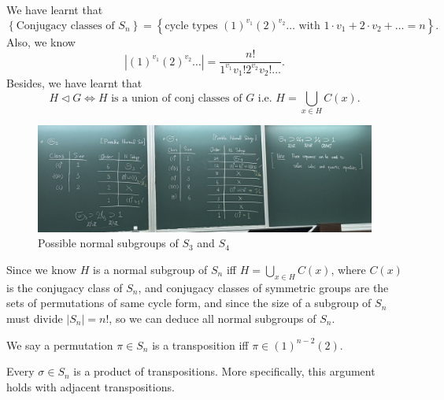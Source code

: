 \begin{prev}
    We have learnt that 
    \[
        \left\{ \text{Conjugacy classes of } S_n  \right\} = \left\{ \text{cycle types } (1)^{v_1}(2)^{v_2}\dots \text{ with } 1 \cdot v_1 + 2 \cdot v_2 + \dots = n   \right\}.  
    \]
    Also, we know 
    \[
        \left\vert (1)^{v_1} (2)^{v_2} \dots  \right\vert = \frac{n!}{1^{v_1} v_1 ! 2^{v_2} v_2 ! \dots }. 
    \]
    Besides, we have learnt that 
    \[
        H \triangleleft G \iff H \text{ is a union of conj classes of } G \text{ i.e. } H = \bigcup_{x \in H} C(x).   
    \]
\end{prev}

\begin{figure}[H]
    \centering
    \includegraphics[width=\textwidth]{./Figures/PossibleNormalSubgroup.jpg}
    \caption{Possible normal subgroups of \(S_3\) and \(S_4\)}
    \label{fig:PossibleNormalSubgroup}
\end{figure}

\begin{remark}
    Since we know \(H\) is a normal subgroup of \(S_n\) iff \(H = \bigcup_{x \in H} C(x) \), where \(C(x)\) is the conjugacy class of \(S_n\), and conjugacy classes of symmetric groups are the sets of permutations of same cycle form, and since the size of a subgroup of \(S_n\) must divide \(\vert S_n \vert = n!\), so we can deduce all normal subgroups of \(S_n\).     
\end{remark}

\begin{definition}[Transpositions]
    We say a permutation \(\pi \in S_n \) is a transposition iff \(\pi \in (1)^{n-2}(2)\).  
\end{definition}

\begin{theorem}
    Every \(\sigma \in S_n\) is a product of transpositions. More specifically, this argument holds with adjacent transpositions. 
\end{theorem}

